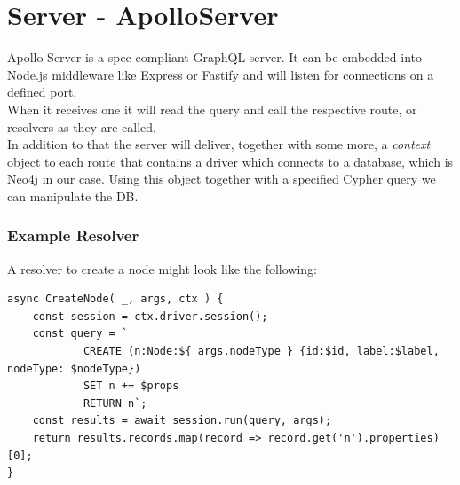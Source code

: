 \section{Server - ApolloServer}
Apollo Server is a spec-compliant GraphQL server. It can be embedded into Node.js middleware like Express or Fastify \cite{ApolloServerIntro} and will listen for connections on a defined port. \\
When it receives one it will read the query and call the respective route, or resolvers as they are called. \\
In addition to that the server will deliver, together with some more, a \emph{context} object to each route that contains a driver which connects to a database, which is Neo4j in our case. Using this object together with a specified Cypher query we can manipulate the DB. 

\subsubsection{Example Resolver}
A resolver to create a node might look like the following:

\begin{lstlisting}[caption={A Basic Resolver},label={ex241}]
async CreateNode( _, args, ctx ) { 
	const session = ctx.driver.session(); 
	const query = ` 
			CREATE (n:Node:${ args.nodeType } {id:$id, label:$label, nodeType: $nodeType}) 
			SET n += $props 
			RETURN n`; 
	const results = await session.run(query, args);
	return results.records.map(record => record.get('n').properties)[0]; 
}
\end{lstlisting}

